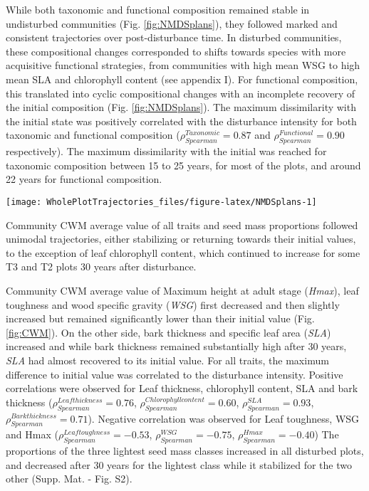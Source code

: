 \documentclass[fleqn,10pt]{ArtEcoFoG} %
\begin{document}
While both taxonomic and functional composition remained stable in
undisturbed communities (Fig. \ref{fig:NMDSplans}), they followed marked
and consistent trajectories over post-\break disturbance time. In
disturbed communities, these compositional changes corresponded to
shifts towards species with more acquisitive functional strategies, from
communities with high mean WSG to high mean SLA and chlorophyll content
(see appendix I). For functional composition, this translated into
cyclic compositional changes with an incomplete recovery of the initial
composition (Fig. \ref{fig:NMDSplans}). The maximum dissimilarity with
the initial state was positively correlated with the disturbance
intensity for both taxonomic and functional composition
(\(\rho_{Spearman}^{Taxonomic}=0.87\) and
\(\rho_{Spearman}^{Functional}=0.90\) respectively). The maximum
dissimilarity with the initial was reached for taxonomic composition
between 15 to 25 years, for most of the plots, and around 22 years for
functional composition.

\begin{figure*}

{\centering \texttt{[image: WholePlotTrajectories\_files/figure-latex/NMDSplans-1]} 

}

\caption{Plot trajectories in terms of taxonomic composition (\textbf{(a)} and \textbf{(c)}) and functional composition (\textbf{(b)} and \textbf{(d)}) in a two-dimensional NMDS space. Lower panels (\textbf{(c)} and \textbf{(d)}) represent the Euclidean distance to initial condition along the 30 sampled years. Shaded areas are the credibility intervals.}\label{fig:NMDSplans}
\end{figure*}

Community CWM average value of all traits and seed mass proportions
followed unimodal trajectories, either stabilizing or returning towards
their initial values, to the exception of leaf chlorophyll content,
which continued to increase for some T3 and T2 plots 30 years after
disturbance.

Community CWM average value of Maximum height at adult stage
(\emph{Hmax}), leaf toughness and wood specific gravity (\emph{WSG})
first decreased and then slightly increased but remained significantly
lower than their initial value (Fig. \ref{fig:CWM}). On the other side,
bark thickness and specific leaf area (\emph{SLA}) increased and while
bark thickness remained substantially high after 30 years, \emph{SLA}
had almost recovered to its initial value. For all traits, the maximum
difference to initial value was correlated to the disturbance intensity.
Positive correlations were observed for Leaf thickness, chlorophyll
content, SLA and bark thickness
(\(\rho_{Spearman}^{Leaf thickness}=0.76\),
\(\rho_{Spearman}^{Chlorophyll content}=0.60\),
\(\rho_{Spearman}^{SLA}=0.93\),
\(\rho_{Spearman}^{Bark thickness}=0.71\)). Negative correlation was
observed for Leaf toughness, WSG and Hmax
(\(\rho_{Spearman}^{Leaf toughness}=-0.53\),
\(\rho_{Spearman}^{WSG}=-0.75\), \(\rho_{Spearman}^{Hmax}=-0.40\)) The
proportions of the three lightest seed mass classes increased in all
disturbed plots, and decreased after 30 years for the lightest class
while it stabilized for the two other (Supp. Mat. - Fig. S2).
\end{document}
